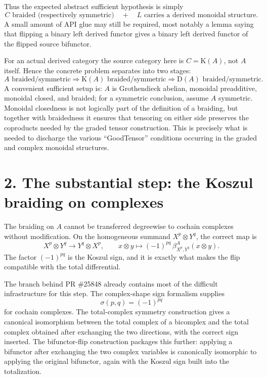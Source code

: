 \documentclass[10pt,a4paper]{article}
\newcommand{\K}{\mathrm K(A)}
\newcommand{\D}{\mathrm D(A)}
\begin{document}
Thus the expected abstract sufficient hypothesis is simply
\[
  \boxed{\text{$C$ braided (respectively symmetric)}
  \quad + \quad
  \text{$L$ carries a derived monoidal structure}.}
\]
A small amount of API glue may still be required, most notably a lemma saying that flipping a binary left derived functor gives a binary left derived functor of the flipped source bifunctor.

For an actual derived category the source category here is $C=\K$, not $A$ itself. Hence the concrete problem separates into two stages:
\[
  A \text{ braided/symmetric}
  \Longrightarrow
  \K \text{ braided/symmetric}
  \Longrightarrow
  \D \text{ braided/symmetric}.
\]
A convenient sufficient setup is: $A$ is Grothendieck abelian, monoidal preadditive, monoidal closed, and braided; for a symmetric conclusion, assume $A$ symmetric. Monoidal closedness is not logically part of the definition of a braiding, but together with braidedness it ensures that tensoring on either side preserves the coproducts needed by the graded tensor construction. This is precisely what is needed to discharge the various ``GoodTensor'' conditions occurring in the graded and complex monoidal structures.

\section*{2. The substantial step: the Koszul braiding on complexes}

The braiding on $A$ cannot be transferred degreewise to cochain complexes without modification. On the homogeneous summand $X^p\otimes Y^q$, the correct map is
\[
  X^p\otimes Y^q \longrightarrow Y^q\otimes X^p,
  \qquad
  x\otimes y \longmapsto (-1)^{pq}\,\beta^A_{X^p,Y^q}(x\otimes y).
\]
The factor $(-1)^{pq}$ is the Koszul sign, and it is exactly what makes the flip compatible with the total differential.

The branch behind PR \#25848 already contains most of the difficult infrastructure for this step. The complex-shape sign formalism supplies
\[
  \sigma(p,q)=(-1)^{pq}
\]
for cochain complexes. The total-complex symmetry construction gives a canonical isomorphism between the total complex of a bicomplex and the total complex obtained after exchanging the two directions, with the correct sign inserted. The bifunctor-flip construction packages this further: applying a bifunctor after exchanging the two complex variables is canonically isomorphic to applying the original bifunctor, again with the Koszul sign built into the totalization.
\end{document}
